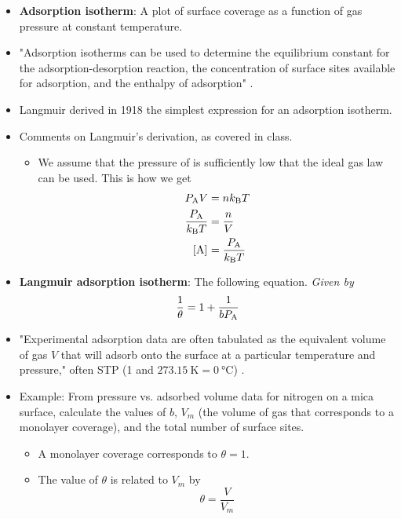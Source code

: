 \documentclass[../notes.tex]{subfiles}
\begin{document}
\begin{itemize}
\begin{itemize}
    \end{itemize}
    \item \textbf{Adsorption isotherm}: A plot of surface coverage as a function of gas pressure at constant temperature.
    \item "Adsorption isotherms can be used to determine the equilibrium constant for the adsorption-desorption reaction, the concentration of surface sites available for adsorption, and the enthalpy of adsorption" \parencite[1297]{bib:McQuarrieSimon}.
    \item Langmuir derived in 1918 the simplest expression for an adsorption isotherm.
    \item Comments on Langmuir's derivation, as covered in class.
    \begin{itemize}
        \item We assume that the pressure of  is sufficiently low that the ideal gas law can be used. This is how we get
        \begin{align*}
            P_{\ce{A}}V &= n\kB T\\
            \frac{P_{\ce{A}}}{\kB T} &= \frac{n}{V}\\
            \cnc{A} &= \frac{P_{\ce{A}}}{\kB T}
        \end{align*}
    \end{itemize}
    \item \textbf{Langmuir adsorption isotherm}: The following equation. \emph{Given by}
    \begin{equation*}
        \frac{1}{\theta} = 1+\frac{1}{bP_{\ce{A}}}
    \end{equation*}
    \item "Experimental adsorption data are often tabulated as the equivalent volume of gas $V$ that will adsorb onto the surface at a particular temperature and pressure," often STP (\SI{1}{\atmosphere} and $\SI{273.15}{\kelvin}=\SI{0}{\celsius}$) \parencite[1299]{bib:McQuarrieSimon}.
    \item Example: From pressure vs. adsorbed volume data for nitrogen on a mica surface, calculate the values of $b$, $V_m$ (the volume of gas that corresponds to a monolayer coverage), and the total number of surface sites.
    \begin{itemize}
        \item A monolayer coverage corresponds to $\theta=1$.
        \item The value of $\theta$ is related to $V_m$ by
        \begin{equation*}
            \theta = \frac{V}{V_m}

\end{equation*}
\end{itemize}
\end{itemize}
\end{document}
